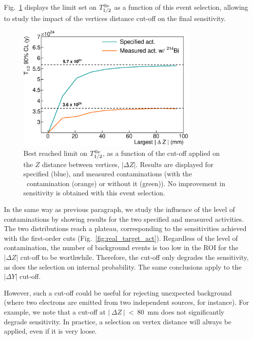 Fig.~\ref{fig:cont_vertex} displays the limit set on $T_{1/2}^{0\nu}$ as a function of this event selection, allowing to study the impact of the vertices distance cut-off on the final sensitivity.
\begin{figure}[h]
  \centering
  \includegraphics[width=0.8\textwidth]{Sensitivity/fig_sensitivity/contamination_vertex.eps}
  \caption{Best reached limit on $T_{1/2}^{0\nu}$, as a function of the cut-off applied on the $Z$ distance between vertices, $|\Delta Z|$.
    Results are displayed for specified (blue), and measured contaminations (with the \Bi\ contamination (orange) or without it (green)).
    No improvement in sensitivity is obtained with this event selection.
    \label{fig:cont_vertex}}
\end{figure}
In the same way as previous paragraph, we study the influence of the level of contaminations by showing results for the two specified and measured activities.
The two distributions reach a plateau, corresponding to the sensitivities achieved with the first-order cuts (Fig.~\ref{fig:real_target_act}).
Regardless of the level of contamination, the number of background events is too low in the ROI for the $| \Delta Z|$ cut-off to be worthwhile.
Therefore, the cut-off only degrades the sensitivity, as does the selection on internal probability.
The same conclusions apply to the $| \Delta Y |$ cut-off.

However, such a cut-off could be useful for rejecting unexpected background (where two electrons are emitted from two independent sources, for instance).
For example, we note that a cut-off at $|~\Delta Z~|~<~80$~mm does not significantly degrade sensitivity.
In practice, a selection on vertex distance will always be applied, even if it is very loose.

